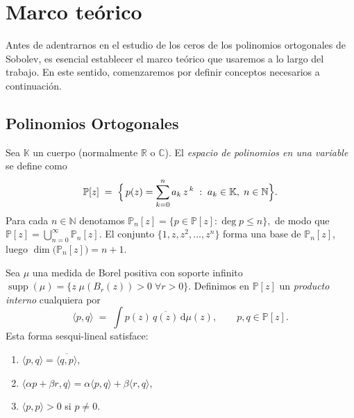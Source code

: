 \chapter{Marco teórico}
\label{ch:marco-teorico}

Antes de adentrarnos en el estudio de los ceros de los polinomios ortogonales de Sobolev, es esencial establecer el marco teórico que usaremos a lo largo del trabajo. En este sentido, comenzaremos por definir conceptos necesarios a continuación.

\section{Polinomios Ortogonales}

\begin{definition}\label{def:espacio-polinomios}
	Sea $\mathbb{K}$ un cuerpo (normalmente $\mathbb{R}$ o $\mathbb{C}$).
	El \emph{espacio de polinomios en una variable} se define como
	\[
		\mathbb{P}[z]\;=\;
		\Bigl\{\,p(z)=\sum_{k=0}^{n} a_k\,z^{\,k}\;:\;
		a_k\in\mathbb{K},\;n\in\mathbb{N}\Bigr\}.
	\]
	Para cada $n\in\mathbb{N}$ denotamos
	$
		\mathbb{P}_{n}[z]=\{p\in\mathbb{P}[z]:\deg p\le n\},
	$
	de modo que $\mathbb{P}[z]=\bigcup_{n=0}^{\infty}\mathbb{P}_{n}[z]$.
	El conjunto $\{1,z,z^{2},\dots,z^{n}\}$ forma una base de
	$\mathbb{P}_{n}[z]$, luego $\dim\!\bigl(\mathbb{P}_{n}[z]\bigr)=n+1$.
\end{definition}

\begin{definition}\label{def:producto-interno-general-medida}
	Sea $\mu$ una medida de Borel positiva con soporte infinito $\operatorname{supp}(\mu)=\{z\;\mu(B_r(z))>0\;\forall r>0\}$. Definimos en $\mathbb{P}[z]$ un \emph{producto interno} cualquiera por
	\[
		\langle p,q\rangle
		\;=\;
		\int p(z)\,\overline{q(z)}\,\mathrm d\mu(z),
		\qquad p,q\in\mathbb{P}[z].
	\]
	Esta forma sesqui-lineal satisface:
	\begin{enumerate}
		\item $\langle p,q\rangle=\overline{\langle q,p\rangle}$,
		\item $\langle \alpha p+\beta r,q\rangle
			      =\alpha\langle p,q\rangle+\beta\langle r,q\rangle$,
		\item $\langle p,p\rangle>0$ si $p\neq0$.
	\end{enumerate}
\end{definition}

